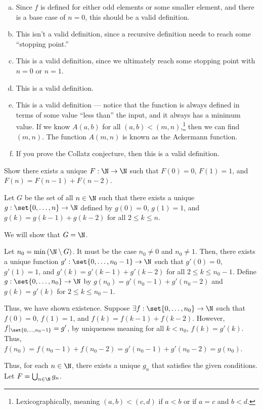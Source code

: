 \documentclass[10pt]{mypackage}
\begin{document}
\begin{answer}\hfill
  \begin{enumerate}[(a)]
    \item Since $f$ is defined for either odd elements or some smaller element, and there is a base case of $n=0$, this should be a valid definition.
    \item This isn't a valid definition, since a recursive definition needs to reach some ``stopping point.''
    \item This is a valid definition, since we ultimately reach some stopping point with $n=0$ or $n=1$.
    \item This is a valid definition.
    \item This is a valid definition --- notice that the function is always defined in terms of some value ``less than'' the input, and it always has a minimum value. If we know $A(a,b)$ for all $(a,b) < (m,n)$,\footnote{Lexicographically, meaning $(a,b) < (c,d)$ if $a < b$ or if $a = c$ and $b < d$.} then we can find $(m,n)$. The function $A(m,n)$ is known as the Ackermann function.
    \item If you prove the Collatz conjecture, then this is a valid definition.
  \end{enumerate}
\end{answer}
\begin{example}
  Show there exists a unique $F: \N\rightarrow \N$ such that $F(0) = 0$, $F(1) = 1$, and $F(n) = F(n-1) + F(n-2)$.\newline

  Let $G$ be the set of all $n\in \N$ such that there exists a unique $g: \set{0,\dots,n}\rightarrow \N$ defined by $g(0) = 0$, $g(1) = 1$, and $g(k) = g(k-1) + g(k-2)$ for all $2 \leq k \leq n$.\newline

  We will show that $G = \N$.\newline

  Let $n_0 = \min\left(\N\setminus G\right)$. It must be the case $n_0 \neq 0$ and $n_0 \neq 1$. Then, there exists a unique function $g': \set{0,\dots,n_0 - 1}\rightarrow \N$ such that $g'(0) = 0$, $g'(1) = 1$, and $g'(k) = g'(k-1) + g'(k-2)$ for all $2 \leq k \leq n_0 - 1$. Define $g: \set{0,\dots,n_0} \rightarrow \N$ by $g\left(n_0\right) = g'\left(n_0-1\right) + g'\left(n_0 - 2\right)$ and $g(k) = g'(k)$ for $2\leq k \leq n_0 - 1$.\newline

  Thus, we have shown existence. Suppose $\exists f: \set{0,\dots,n_0}\rightarrow \N$ such that $f(0) = 0$, $f(1) = 1$, and $f(k) = f(k-1) + f(k-2)$. However, $f|_{\set{0,\dots,n_0 - 1}} = g'$, by uniqueness meaning for all $k < n_0$, $f(k) = g'(k)$. Thus, $f\left(n_0\right) = f\left(n_0 - 1\right) + f\left(n_0 - 2\right) = g'\left(n_0 - 1\right) + g'\left(n_0 - 2\right) = g\left(n_0\right)$.\newline

  Thus, for each $n\in \N$, there exists a unique $g_n$ that satisfies the given conditions. Let $F = \bigcup_{n\in \N}g_n$.
\end{example}
\end{document}
